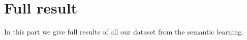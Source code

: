 \section{Full result}

In this part we give full results of all our dataset from the semantic learning.


